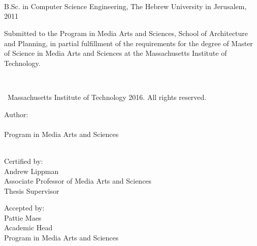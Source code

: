 \begin{titlepage}
    \begin{addmargin}[-1cm]{-2cm}
      {\setlength{\parindent}{0cm}
        \large  

        \hfill


        \begingroup
            \color{Maroon}\spacedallcaps{\myTitle} \\ 
            \mySubtitle \\ 

            \bigskip
        \endgroup



        \spacedlowsmallcaps{\myName}\\ 

        \vfill        

        {\small B.Sc. in Computer Science Engineering, The Hebrew University in Jerusalem, 2011 } \\ \medskip

        {
            Submitted to the Program in Media Arts and Sciences, 
            School of Architecture and Planning, in partial fulfillment of the requirements 
            for the degree of Master of Science in Media Arts and Sciences at the 
            Massachusetts Institute of\\ Technology. 
        }\\ \medskip

         \\ \medskip

        \textcopyright\ Massachusetts Institute of Technology 2016. All rights reserved. \\ 

        \bigskip


        Author:\\
        \myName \\
        Program in Media Arts and Sciences \\ 
        \myTime \\ \bigskip

        Certified by:\\
        Andrew Lippman\\
        Associate Professor of Media Arts and Sciences\\
        Thesis Supervisor\\ \bigskip

        Accepted by:\\
        Pattie Maes \\
        Academic Head\\
        Program in Media Arts and Sciences\\



        }
  \end{addmargin}       
\end{titlepage}   
